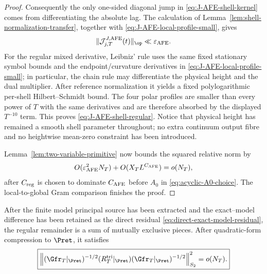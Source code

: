 \begin{proof}
Consequently the only one-sided diagonal jump in
\eqref{eq:J-AFE-shell-kernel} comes from differentiating the absolute lag.
The calculation of Lemma~\ref{lem:shell-normalization-transfer}, together with
\eqref{eq:J-AFE-local-profile-small}, gives
\[
\|\mathcal J^{J,\rm AFE}_{j,T}(t)\|_{\op}
\ll\varepsilon_{\rm AFE}.
\]
For the regular mixed derivative, Leibniz' rule uses the same fixed stationary
symbol bounds and the endpoint/curvature derivatives in
\eqref{eq:J-AFE-local-profile-small}; in particular, the chain rule may
differentiate the physical height and the dual multiplier.  After reference
normalization it yields a fixed polylogarithmic per-shell Hilbert--Schmidt bound.
The four polar profiles are smaller than every power of $T$ with the same
derivatives and are therefore absorbed by the displayed $T^{-10}$ term.  This proves
\eqref{eq:J-AFE-shell-regular}.  Notice that physical height has remained a
smooth shell parameter throughout; no extra continuum output fibre and no
heightwise mean-zero constraint has been introduced.

Lemma~\ref{lem:two-variable-primitive} now bounds the squared relative norm by
\[
O(\varepsilon_{\rm AFE}^2N_T)
+O(X_TL^{C_{\rm AFE}})=o(N_T),
\]
after $C_{\rm reg}$ is chosen to dominate $C_{\rm AFE}$ before $A_0$ in
\eqref{eq:acyclic-A0-choice}.  The local-to-global Gram comparison finishes the
proof.
\end{proof}

\begin{proposition}
\label{prop:regular-ledger}
After the finite model principal source has been extracted and the exact--model
difference has been retained as the direct residual
\eqref{eq:direct-exact-model-residual}, the regular remainder is a sum of
mutually exclusive pieces. After quadratic-form compression to $\Pret$, it
satisfies
\begin{equation}
\boxed{
\left\|
(\Gfr_T|_{\Pret})^{-1/2}(R_T^{\rm tri}|_{\Pret})
(\Gfr_T|_{\Pret})^{-1/2}
\right\|_{S_2}^2=o(N_T).
}
\label{eq:regular-HS}
\end{equation}
\end{proposition}

